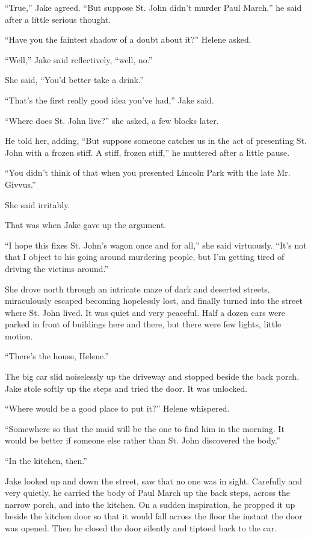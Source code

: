 \documentclass{novel}
\begin{document}
“True,” Jake agreed. “But suppose St. John didn’t murder Paul March,” he said after a little serious thought.

“Have you the faintest shadow of a doubt about it?” Helene asked.

“Well,” Jake said reflectively, “well, no.”

She said, “You’d better take a drink.”

“That’s the first really good idea you’ve had,” Jake said.

“Where does St. John live?” she asked, a few blocks later.

He told her, adding, “But suppose someone catches us in the act of presenting St. John with a frozen stiff. A stiff, frozen stiff,” he muttered after a little pause.

“You didn’t think of that when you presented Lincoln Park with the late Mr. Givvus.”

She said irritably.

That was when Jake gave up the argument.

“I hope this fixes St. John’s wagon once and for all,” she said virtuously. “It’s not that I object to his going around murdering people, but I’m getting tired of driving the victims around.”

She drove north through an intricate maze of dark and deserted streets, miraculously escaped becoming hopelessly lost, and finally turned into the street where St. John lived. It was quiet and very peaceful. Half a dozen cars were parked in front of buildings here and there, but there were few lights, little motion.

“There’s the house, Helene.”

The big car slid noiselessly up the driveway and stopped beside the back porch. Jake stole softly up the steps and tried the door. It was unlocked.

“Where would be a good place to put it?” Helene whispered.

“Somewhere so that the maid will be the one to find him in the morning. It would be better if someone else rather than St. John discovered the body.”

“In the kitchen, then.”

Jake looked up and down the street, saw that no one was in sight. Carefully and very quietly, he carried the body of Paul March up the back steps, across the narrow porch, and into the kitchen. On a sudden inspiration, he propped it up beside the kitchen door so that it would fall across the floor the instant the door was opened. Then he closed the door silently and tiptoed back to the car.
\end{document}
